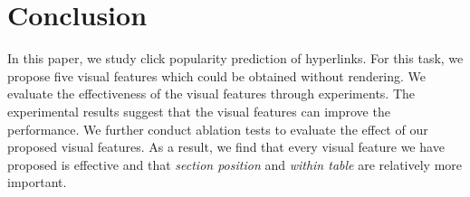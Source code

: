 \section{Conclusion}

In this paper, we study click popularity prediction of hyperlinks. For this task, we propose five visual features which could be obtained without rendering. We evaluate the effectiveness of the visual features through experiments. The experimental results suggest that the visual features can improve the performance. We further conduct ablation tests to evaluate the effect of our proposed visual features. As a result, we find that every visual feature we have proposed is effective and that \emph{section position} and \emph{within table} are relatively more important.